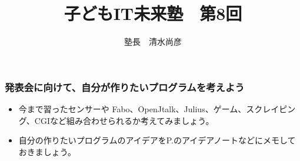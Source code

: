 \documentclass[dvipdfmx]{beamer}
\title{子どもIT未来塾　第8回}
\author{塾長　清水尚彦}
\begin{document}
\begin{frame}[fragile]
	\frametitle{\large{発表会に向けて、自分が作りたいプログラムを考えよう}~~~}
    \begin{itemize}
        \item 今まで習ったセンサーや Fabo、OpenJtalk、Julius、ゲーム、スクレイピング、CGIなど組み合わせられるか考えてみましょう。
        \item 自分の作りたいプログラムのアイデアをP.\pageref{1:P:challenge}のアイデアノートなどにメモしておきましょう。        
    \end{itemize}
\end{frame}
\end{document}
